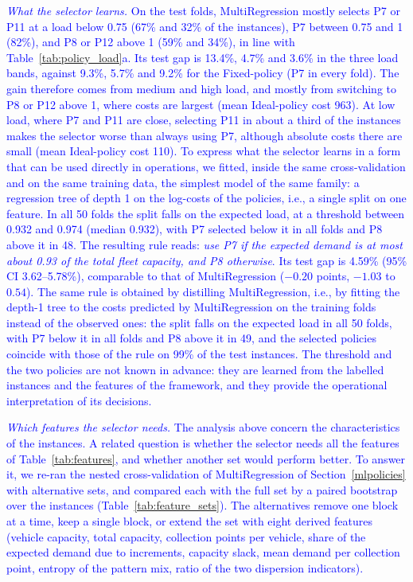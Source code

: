 \documentclass[authoryear,preprint,12pt]{elsarticle}
\newcommand{\rev}[1]{\textcolor{blue}{{#1}}}
\begin{document}
\rev{\textit{What the selector learns.} On the test folds, MultiRegression mostly selects P7 or P11 at a load below 0.75 (67\% and 32\% of the instances), P7 between 0.75 and 1 (82\%), and P8 or P12 above 1 (59\% and 34\%), in line with Table~\ref{tab:policy_load}a. Its test gap is 13.4\%, 4.7\% and 3.6\% in the three load bands, against 9.3\%, 5.7\% and 9.2\% for the Fixed-policy (P7 in every fold). The gain therefore comes from medium and high load, and mostly from switching to P8 or P12 above 1, where costs are largest (mean Ideal-policy cost 963). At low load, where P7 and P11 are close, selecting P11 in about a third of the instances makes the selector worse than always using P7, although absolute costs there are small (mean Ideal-policy cost 110).
To express what the selector learns in a form that can be used directly in operations, we fitted, inside the same cross-validation and on the same training data, the simplest model of the same family: a regression tree of depth 1 on the log-costs of the policies, i.e., a single split on one feature. In all 50 folds the split falls on the expected load, at a threshold between 0.932 and 0.974 (median 0.932), with P7 selected below it in all folds and P8 above it in 48. The resulting rule reads: \textit{use P7 if the expected demand is at most about 0.93 of the total fleet capacity, and P8 otherwise}. Its test gap is 4.59\% (95\% CI 3.62--5.78\%), comparable to that of MultiRegression ($-0.20$ points, $-1.03$ to $0.54$). The same rule is obtained by distilling MultiRegression, i.e., by fitting the depth-1 tree to the costs predicted by MultiRegression on the training folds instead of the observed ones: the split falls on the expected load in all 50 folds, with P7 below it in all folds and P8 above it in 49, and the selected policies coincide with those of the rule on 99\% of the test instances. The threshold and the two policies are not known in advance: they are learned from the labelled instances and the features of the framework, and they provide the operational interpretation of its decisions.}

\rev{\textit{Which features the selector needs.} The analysis above concern the characteristics of the instances. A related question is whether the selector needs all the features of Table~\ref{tab:features}, and whether another set would perform better. To answer it, we re-ran the nested cross-validation of MultiRegression of Section~\ref{mlpolicies} with alternative sets, and compared each with the full set by a paired bootstrap over the instances (Table~\ref{tab:feature_sets}). The alternatives remove one block at a time, keep a single block, or extend the set with eight derived features (vehicle capacity, total capacity, collection points per vehicle, share of the expected demand due to increments, capacity slack, mean demand per collection point, entropy of the pattern mix, ratio of the two dispersion indicators). }
\end{document}
